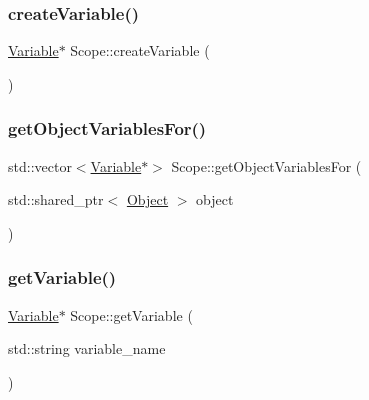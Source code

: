\mbox{\label{classScope_a99112eccd8fd60ac511ed9b754268a6d}} 
\subsubsection{\texorpdfstring{create\+Variable()}{createVariable()}}
{\footnotesize\ttfamily \hyperlink{classVariable}{Variable}$\ast$ Scope\+::create\+Variable (\begin{DoxyParamCaption}{ }\end{DoxyParamCaption})}

\mbox{\label{classScope_a93fdedbd4bd26e9eceb1a0e367b3785c}} 
\subsubsection{\texorpdfstring{get\+Object\+Variables\+For()}{getObjectVariablesFor()}}
{\footnotesize\ttfamily std\+::vector$<$\hyperlink{classVariable}{Variable}$\ast$$>$ Scope\+::get\+Object\+Variables\+For (\begin{DoxyParamCaption}\item[{std\+::shared\+\_\+ptr$<$ \hyperlink{classObject}{Object} $>$}]{object }\end{DoxyParamCaption})}

\mbox{\label{classScope_a910e045176dbe71d2260bac3204e47bb}} 
\subsubsection{\texorpdfstring{get\+Variable()}{getVariable()}}
{\footnotesize\ttfamily \hyperlink{classVariable}{Variable}$\ast$ Scope\+::get\+Variable (\begin{DoxyParamCaption}\item[{std\+::string}]{variable\+\_\+name }\end{DoxyParamCaption})}

\mbox{\label{classScope_aa6e0e555c44953e4c8eebaa4adba0b1a}} 
